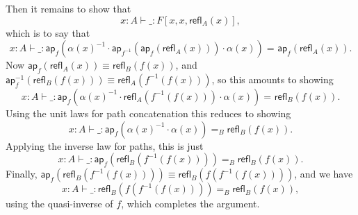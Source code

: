 \documentclass{article}
\newcommand{\idty}[3]{{#2}\mathbin{=_{#1}}{#3}}
\newcommand{\refl}[2]{\mathsf{refl}_{#1}({#2})}
\newcommand{\app}[2]{{#1}({#2})}
\newcommand{\pa}[1]{\mathsf{ap}_{#1}}
\newcommand{\iv}[1]{#1^{-1}}
\newcommand{\concat}[2]{{#1}\cdot{#2}}
\begin{document}
Then it remains to show that
\begin{displaymath}
  x{:}A \vdash \_ : F[x,x,\refl{A}{x}],
\end{displaymath}
which is to say that 
\begin{displaymath}
  x{:}A \vdash \_ : \idty{}{\app{\pa{f}}{\concat{\concat{\iv{\app{\alpha}{x}}}{\app{\pa{\iv{f}}}{\app{\pa{f}}{\refl{A}{x}}}}}{\app{\alpha}{x}}}}{\app{\pa{f}}{\refl{A}{x}}}.
\end{displaymath}
Now $\app{\pa{f}}{\refl{A}{x}}\equiv\refl{B}{\app{f}{x}}$, and
$\app{\iv{\pa{f}}}{\refl{B}{\app{f}{x}}} \equiv \refl{A}{\app{\iv{f}}{\app{f}{x}}}$, so this amounts to
showing
\begin{displaymath}
  x{:}A \vdash \_ : \idty{}{\app{\pa{f}}{\concat{\concat{\iv{\app{\alpha}{x}}}{\refl{A}{\app{\iv{f}}{\app{f}{x}}}}}{\app{\alpha}{x}}}}{\refl{B}{\app{f}{x}}}.
\end{displaymath}
Using the unit laws for path concatenation this reduces to showing
\begin{displaymath}
  x{:}A \vdash \_ : \idty{B}{\app{\pa{f}}{\concat{\iv{\app{\alpha}{x}}}{\app{\alpha}{x}}}}{\refl{B}{\app{f}{x}}}.
\end{displaymath}
Applying the inverse law for paths, this is just
\begin{displaymath}
  x:{A} \vdash \_ : \idty{B}{\app{\pa{f}}{\refl{B}{\app{\iv{f}}{\app{f}{x}}}}}{\refl{B}{\app{f}{x}}}.
\end{displaymath}
Finally, $\app{\pa{f}}{\refl{B}{\app{\iv{f}}{\app{f}{x}}}}\equiv \refl{B}{\app{f}{\app{\iv{f}}{\app{f}{x}}}}$, and we have
\begin{displaymath}
  x{:}A \vdash \_ : \idty{B}{\refl{B}{\app{f}{\app{\iv{f}}{\app{f}{x}}}}}{\refl{B}{\app{f}{x}}},
\end{displaymath}
using the quasi-inverse of $f$, which completes the argument.
\end{document}
